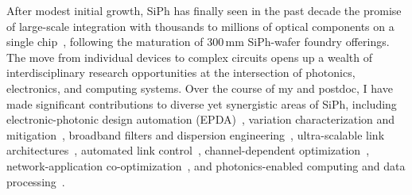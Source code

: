 After modest initial growth, SiPh has finally seen in the past decade the promise of large-scale integration with thousands to millions of optical components on a single chip~\cite{shekharRoadmappingNextGeneration2024}, following the maturation of 300\,mm SiPh-wafer foundry offerings. The move from individual devices to complex circuits opens up a wealth of interdisciplinary research opportunities at the intersection of photonics, electronics, and computing systems. Over the course of my \myDegree{} and postdoc, I have made significant contributions to diverse yet synergistic areas of SiPh, including electronic-photonic design automation (EPDA)~\cite{wuCompactModelingCircuitlevel2017,zhangCompactModelingSilicon2017,jamesFlexibleProcessAwareCompact2022,jamesProcessVariationAwareCompact2023a}, variation characterization and mitigation~\cite{wuPairingMicroringbasedSilicon2018,wangEnergyefficientChannelAlignment2018,wangTamingEmergingDevices2019,wangBidirectionalTuningMicroringbased2019,wangCharacterizationApplicationsSpatial2020,wangEnergyEfficiencyYield2021}, broadband filters and dispersion engineering~\cite{wangDispersionEngineeredFabricationRobustSOI2023,wangIntegratedCompactTunable2023,parsonsOFC25}, ultra-scalable link architectures~\cite{wangScalableArchitectureSubpJ2023,novickHighbandwidthDensitySilicon2023}, automated link control~\cite{wangAutomatedTuningRingAssisted2024,wangInterleaverTuning,wangOFC25}, channel-dependent optimization~\cite{novickIntegratedPhotonicResonant2024,gopalEqualization2024}, network-application co-optimization~\cite{wangTaskMappingAssistedLaser2019,wangTrafficAdaptivePowerReconfiguration2021,michelogiannakisEfficientIntraRackResource2023,wuWavelengthReconfigurableTransceiver2024,wuFlexibleSiliconPhotonic2024}, and photonics-enabled computing and data processing~\cite{naumanOFC25,zypmanDSP}.

